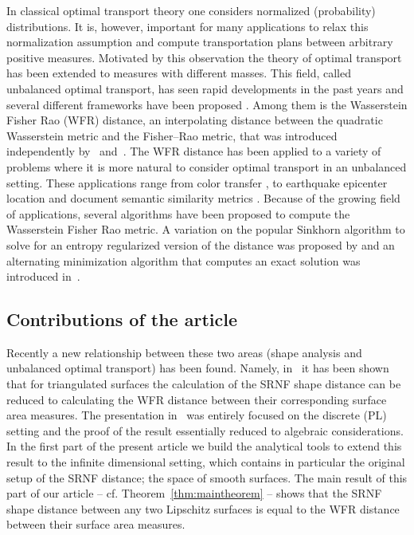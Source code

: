 \documentclass[final,hidelinks,onefignum,onetabnum]{siamart220329}
\begin{document}
 In classical optimal transport theory one considers  normalized (probability) distributions. It is, however, important for many applications to relax this normalization assumption and compute transportation plans between arbitrary positive measures. Motivated by this observation the theory of optimal transport has been extended to measures with different masses. This field,  called unbalanced optimal transport, has seen rapid developments in the past years and several different frameworks have been proposed \cite{chizat2018interpolating,liero2016optimal,Lombardi2015,piccoli2014generalized}. Among them is the Wasserstein Fisher Rao (WFR) distance, an interpolating distance between the quadratic Wasserstein metric and the Fisher–Rao metric, that was introduced independently by~\cite{chizat2018interpolating} and~\cite{liero2018optimal}. The WFR distance has been applied to a variety of problems where it is more natural to consider optimal transport in an  unbalanced setting. These applications range from color transfer \cite{chizat2018scaling}, to earthquake epicenter location \cite{Zhou2018TheWM} and document semantic similarity metrics \cite{Wang2020RobustDD}. Because of the growing field of applications, several algorithms have been proposed to compute  the Wasserstein Fisher Rao metric. A variation on the popular Sinkhorn algorithm to solve for an entropy regularized version of the distance was proposed by \cite{chizat2018scaling} and an alternating minimization algorithm that computes an exact solution was introduced in~\cite{bauer2022SRNF}. 



\subsection{Contributions of the article}
Recently a new relationship between these two areas (shape analysis and unbalanced optimal transport) has been found. Namely, in~\cite{bauer2022SRNF} it has been shown that for triangulated surfaces the calculation of the SRNF shape distance can be reduced to calculating the WFR distance between their corresponding surface area measures. The presentation in~\cite{bauer2022SRNF} was entirely focused on the discrete (PL) setting and the proof of the result essentially reduced to  algebraic considerations.  In the first part of the present article we build the analytical tools to extend  this result to the infinite dimensional setting,  which contains in particular the original setup of the SRNF distance; the space of smooth surfaces. The main result of this part of our article -- cf. Theorem~\ref{thm:maintheorem} -- shows that the SRNF shape distance between any two Lipschitz surfaces is equal to the WFR distance between their surface area measures. 
\end{document}
